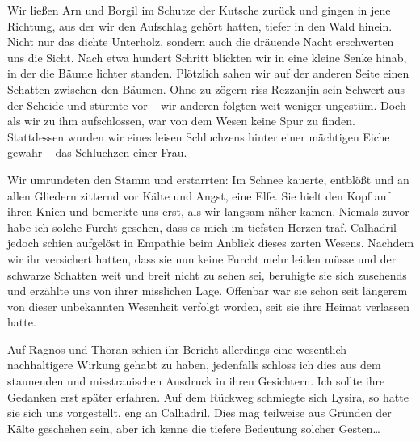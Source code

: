 \documentclass[11pt]{scrreprt}
\begin{document}
Wir ließen Arn und Borgil im Schutze der Kutsche zurück und gingen in jene Richtung, aus der wir den Aufschlag gehört hatten, tiefer in den Wald hinein. Nicht nur das dichte Unterholz, sondern auch die dräuende Nacht erschwerten uns die Sicht. Nach etwa hundert Schritt blickten wir in eine kleine Senke hinab, in der die Bäume lichter standen. Plötzlich sahen wir auf der anderen Seite einen Schatten zwischen den Bäumen. Ohne zu zögern riss Rezzanjin sein Schwert aus der Scheide und stürmte vor – wir anderen folgten weit weniger ungestüm. Doch als wir zu ihm aufschlossen, war von dem Wesen keine Spur zu finden. Stattdessen wurden wir eines leisen Schluchzens hinter einer mächtigen Eiche gewahr – das Schluchzen einer Frau.\par
  
Wir umrundeten den Stamm und erstarrten: Im Schnee kauerte, entblößt und an allen Gliedern zitternd vor Kälte und Angst, eine Elfe. Sie hielt den Kopf auf ihren Knien und bemerkte uns erst, als wir langsam näher kamen. Niemals zuvor habe ich solche Furcht gesehen, dass es mich im tiefsten Herzen traf. Calhadril jedoch schien aufgelöst in Empathie beim Anblick dieses zarten Wesens. Nachdem wir ihr versichert hatten, dass sie nun keine Furcht mehr leiden müsse und der schwarze Schatten weit und breit nicht zu sehen sei, beruhigte sie sich zusehends und erzählte uns von ihrer misslichen Lage. Offenbar war sie schon seit längerem von dieser unbekannten Wesenheit verfolgt worden, seit sie ihre Heimat verlassen hatte. \par

Auf Ragnos und Thoran schien ihr Bericht allerdings eine wesentlich nachhaltigere Wirkung gehabt zu haben, jedenfalls schloss ich dies aus dem staunenden und misstrauischen Ausdruck in ihren Gesichtern. Ich sollte ihre Gedanken erst später erfahren. Auf dem Rückweg schmiegte sich Lysira, so hatte sie sich uns vorgestellt, eng an Calhadril. Dies mag teilweise aus Gründen der Kälte geschehen sein, aber ich kenne die tiefere Bedeutung solcher Gesten…\par
\end{document}
